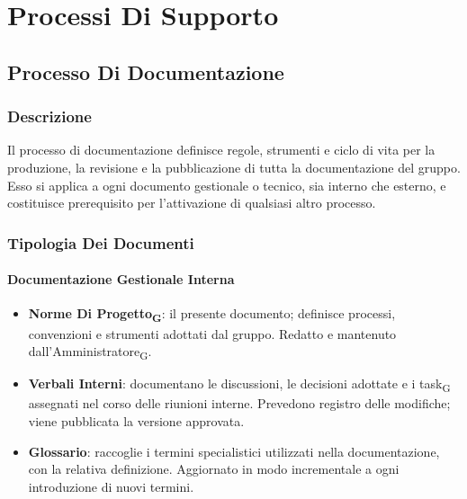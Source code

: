\section{Processi Di Supporto}
 
\subsection{Processo Di Documentazione}
\label{sec:documentazione}
 
\subsubsection{Descrizione}
 
Il processo di documentazione definisce regole, strumenti e ciclo di vita per la
produzione, la revisione e la pubblicazione di tutta la documentazione del gruppo.
Esso si applica a ogni documento gestionale o tecnico, sia interno che esterno, e
costituisce prerequisito per l'attivazione di qualsiasi altro processo.
 
\subsubsection{Tipologia Dei Documenti}
 
\paragraph{Documentazione Gestionale Interna}
\begin{itemize}
  \item \textbf{Norme Di Progetto\textsubscript{G}}: il presente documento;
        definisce processi, convenzioni e strumenti adottati dal gruppo.
        Redatto e mantenuto dall'Amministratore\textsubscript{G}.
  \item \textbf{Verbali Interni}: documentano le discussioni, le decisioni adottate
        e i task\textsubscript{G} assegnati nel corso delle riunioni interne.
        Prevedono registro delle modifiche; viene pubblicata la versione approvata.
  \item \textbf{Glossario}: raccoglie i termini specialistici utilizzati nella
        documentazione, con la relativa definizione. Aggiornato in modo incrementale
        a ogni introduzione di nuovi termini.
\end{itemize}
 
